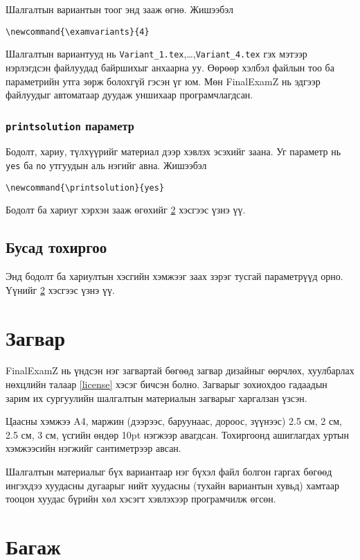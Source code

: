 \documentclass[10pt]{article}
\theoremstyle{definition}
\begin{document}
Шалгалтын вариантын тоог энд зааж өгнө. Жишээбэл 
\begin{verbatim}
\newcommand{\examvariants}{4}
\end{verbatim}
Шалгалтын вариантууд нь \texttt{Variant\_1.tex},\ldots,\texttt{Variant\_4.tex} гэх мэтээр нэрлэгдсэн файлуудад байршихыг анхаарна уу. Өөрөөр хэлбэл файлын тоо ба параметрийн утга зөрж болохгүй гэсэн үг юм. Мөн FinalExamZ нь эдгээр файлуудыг автоматаар дуудаж уншихаар програмчлагдсан.

\subsubsection{\texttt{printsolution} параметр}

Бодолт, хариу, түлхүүрийг материал дээр хэвлэх эсэхийг заана. Уг параметр нь \texttt{yes} ба \texttt{no} утгуудын аль нэгийг авна. Жишээбэл 
\begin{verbatim}
\newcommand{\printsolution}{yes}
\end{verbatim}
Бодолт ба хариуг хэрхэн зааж өгөхийг \ref{tools} хэсгээс үзнэ үү.

\subsection{Бусад тохиргоо}

Энд бодолт ба хариултын хэсгийн хэмжээг заах зэрэг тусгай параметрүүд орно. Үүнийг \ref{tools} хэсгээс үзнэ үү.

\section{Загвар}

FinalExamZ нь үндсэн нэг загвартай бөгөөд загвар дизайныг өөрчлөх, хуулбарлах нөхцлийн талаар \ref{license} хэсэг бичсэн болно. Загварыг зохиохдоо гадаадын зарим их сургуулийн шалгалтын материалын загварыг харгалзан үзсэн.

\par Цаасны хэмжээ A4, маржин (дээрээс, баруунаас, дороос, зүүнээс) 2.5 см, 2 см, 2.5 см, 3 см, үсгийн өндөр 10pt нэгжээр авагдсан. Тохиргоонд ашиглагдах уртын хэмжээсийн нэгжийг сантиметрээр авсан.

\par Шалгалтын материалыг бүх вариантаар нэг бүхэл файл болгон гаргах бөгөөд ингэхдээ хуудасны дугаарыг нийт хуудасны (тухайн вариантын хувьд) хамтаар тооцон хуудас бүрийн хөл хэсэгт хэвлэхээр програмчилж өгсөн.

\section{Багаж}\label{tools}
\end{document}
